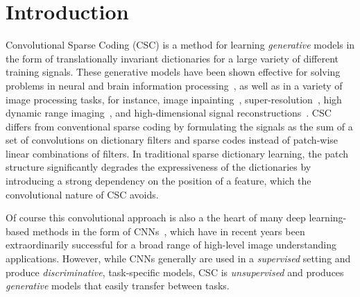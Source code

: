 \section{Introduction}
Convolutional Sparse Coding (CSC) is a method for learning {\em
  generative} models in the form of translationally invariant
dictionaries for a large variety of different training signals.  These
generative models have been shown effective for solving problems in
neural and brain information
processing~\cite{jas2017learning,peter2017sparse}, as well as in a
variety of image processing tasks, for instance, image
inpainting~\cite{heide2015fast},
super-resolution~\cite{gu2015convolutional}, high dynamic range
imaging~\cite{serrano2016convolutional}, and high-dimensional signal
reconstructions~\cite{choudhury2017consensus,bibi2017high}. CSC
differs from conventional sparse coding by formulating the signals as
the sum of a set of convolutions on dictionary filters and sparse
codes instead of patch-wise linear combinations of
filters. In traditional sparse dictionary learning, the patch
structure significantly degrades the expressiveness of the
dictionaries by introducing a strong dependency on the position of a
feature, which the convolutional nature of CSC avoids.

Of course this convolutional approach is also a the heart of many deep
learning-based methods in the form of
CNNs~\cite{lecun1998gradient,kavukcuoglu2010learning,krizhevsky2012imagenet},
which have in recent years been extraordinarily successful for a broad
range of high-level image understanding applications. However, while
CNNs generally are used in a {\em supervised} setting and produce {\em
  discriminative}, task-specific models, CSC is {\em unsupervised} and
produces {\em generative} models that easily transfer between tasks.


